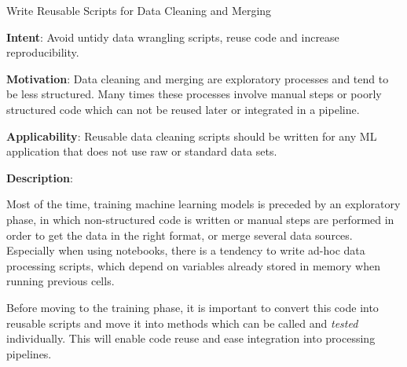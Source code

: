   
  \begin{frame}[plain]{ Write Reusable Scripts for Data Cleaning and Merging
 }

  \textbf{Intent}: Avoid untidy data wrangling scripts, reuse code and increase reproducibility. 
 

  \textbf{Motivation}: Data cleaning and merging are exploratory processes and tend to be less structured. Many times these processes involve manual steps or poorly structured code which can not be reused later or integrated in a pipeline.  
 

  \textbf{Applicability}: Reusable data cleaning scripts should be written for any ML application that does not use raw or standard data sets.
 

  \textbf{Description}: 

Most of the time, training machine learning models is preceded by an exploratory phase, in which non-structured code is written or manual steps are performed in order to get the data in the right format, or merge several data sources.
Especially when using notebooks, there is a tendency to write ad-hoc data processing scripts, which depend on variables already stored in memory when running previous cells.


Before moving to the training phase, it is important to convert this code into reusable scripts and move it into methods which can be called and \emph{tested} individually.
This will enable code reuse and ease integration into processing pipelines.


 


  \end{frame}

